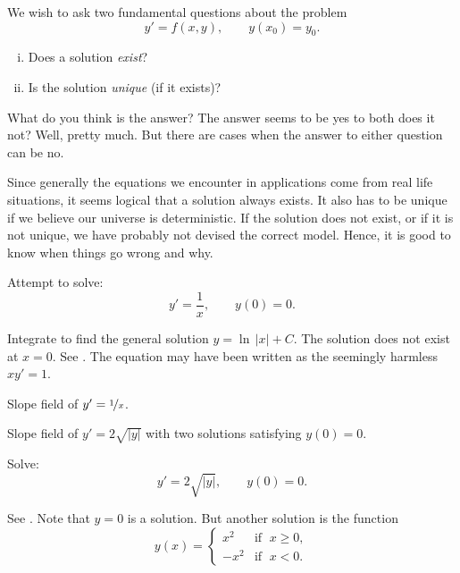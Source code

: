 We wish to ask two fundamental questions about the problem
\begin{equation*}
y' = f(x,y), \qquad y(x_0) = y_0.
\end{equation*}
\begin{enumerate}[(i)]
\item Does a solution \emph{exist}?
\item Is the solution \emph{unique} (if it exists)?
\end{enumerate}

What do you think is the answer?
The answer seems to be yes to both does it not?  Well, pretty much.  But there
are cases when the answer to either question can be no.

Since generally the equations we encounter in applications
come from real life situations, it seems
logical that a solution always exists.
It also has to be unique if we believe our
universe is deterministic.  If the solution does not exist, or if it is
not unique, we have
probably not devised the correct model.  Hence, it is good to know
when things go wrong and why.

\begin{example}
Attempt to solve:
\begin{equation*}
y' = \frac{1}{x}, \qquad y(0) = 0 .
\end{equation*}

Integrate to find the general solution $y = \ln \, \lvert x \rvert + C$.  The
solution does not exist at $x=0$.  See .
The equation may have been written as the seemingly harmless $x y' = 1$.

\begin{myfig}
\parbox[t]{3in}{
 \capstart
 \caption{Slope field of $y' = \nicefrac{1}{x}$.\label{1.3:xinvfig}}
}
\quad
\parbox[t]{3in}{
 \capstart
 \caption{Slope field of $y' = 2 \sqrt{\lvert y \rvert}$ with two
 solutions satisfying $y(0) = 0$.\label{1.3:sqrtfig}}
}
\end{myfig}
\end{example}

\begin{example}
Solve:
\begin{equation*}
y' = 2 \sqrt{\lvert y \rvert}, \qquad y(0) = 0 .
\end{equation*}

See .
Note that $y=0$ is a solution.  But another solution is the function
\begin{equation*}
y(x) =
\begin{cases}
x^2 & \text{if } \; x \geq 0,\\
-x^2 & \text{if } \; x < 0.
\end{cases}
\end{equation*}
\end{example}

